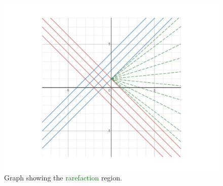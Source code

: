 \documentclass{article}
\newcommand{\green}[1]{\textcolor{green}{#1}}
\begin{document}
\begin{figure}[H]
\begin{center}
\includegraphics[height = 3 in, trim={4cm 4cm 4cm 4cm}, clip]{nonlinear}
\end{center}
\caption{Graph showing the \green{rarefaction} region. \label{fig:example}}
\end{figure}
\end{document}
